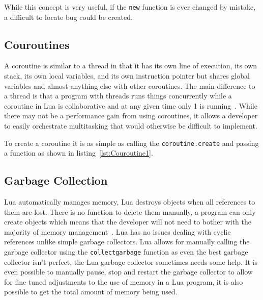 \documentclass[11pt,a4paper,titlepage]{report}
\begin{document}
	\singlespacing
	
	\onehalfspacing


	While this concept is very useful, if the \texttt{new} function is ever changed by mistake, a difficult to locate bug could be created.

\subsection{Couroutines}
	A coroutine is similar to a thread in that it has its own line of execution, its own stack, its own local variables, and its own instruction pointer but shares global variables and almost anything else with other coroutines. The main difference to a thread is that a program with threads runs things concurrently while a coroutine in Lua is collaborative and at any given time only 1 is running~\cite{Ierusalimschy:2013:PLT:2502646}. While there may not be a performance gain from using coroutines, it allows a developer to easily orchestrate multitasking that would otherwise be difficult to implement.

	To create a coroutine it is as simple as calling the \texttt{coroutine.create} and passing a function as shown in listing~\ref{lst:Couroutine1}.

	\singlespacing
	 
	\onehalfspacing


\subsection{Garbage Collection}

	Lua automatically manages memory, Lua destroys objects when all references to them are lost. There is no function to delete them manually, a program can only create objects which means that the developer will not need to bother with the majority of memory management~\cite{Ierusalimschy:2013:PLT:2502646}. Lua has no issues dealing with cyclic references unlike simple garbage collectors. Lua allows for manually calling the garbage collector using the \texttt{collectgarbage} function as even the best garbage collector isn't perfect, the Lua garbage collector sometimes needs some help. It is even possible to manually pause, stop and restart the garbage collector to allow for fine tuned adjustments to the use of memory in a Lua program, it is also possible to get the total amount of memory being used.
\end{document}
